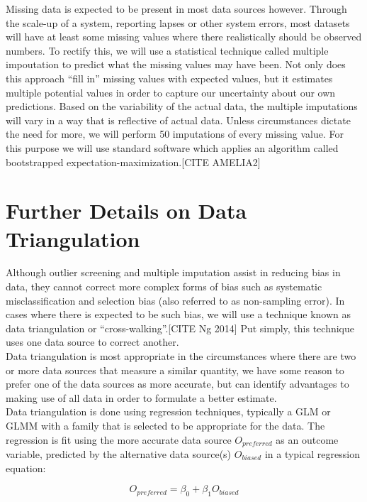 \documentclass[twocolumn]{bmcart}%
\begin{document}
Missing data is expected to be present in most data sources however. Through the scale-up of a system, reporting lapses or other system errors, most datasets will have at least some missing values where there realistically should be observed numbers. To rectify this, we will use a statistical technique called multiple impoutation to predict what the missing values may have been. Not only does this approach ``fill in'' missing values with expected values, but it estimates multiple potential values in order to capture our uncertainty about our own predictions. Based on the variability of the actual data, the multiple imputations will vary in a way that is reflective of actual data. Unless circumstances dictate the need for more, we will perform 50 imputations of every missing value. For this purpose we will use standard software which applies an algorithm called bootstrapped expectation-maximization.[CITE AMELIA2]

\section{Further Details on Data Triangulation} \label{triangulation}
Although outlier screening and multiple imputation assist in reducing bias in data, they cannot correct more complex forms of bias such as systematic misclassification and selection bias (also referred to as non-sampling error). In cases where there is expected to be such bias, we will use a technique known as data triangulation or ``cross-walking''.[CITE Ng 2014] Put simply, this technique uses one data source to correct another. \\

Data triangulation is most appropriate in the circumstances where there are two or more data sources that measure a similar quantity, we have some reason to prefer one of the data sources as more accurate, but can identify advantages to making use of all data in order to formulate a better estimate. \\

Data triangulation is done using regression techniques, typically a GLM or GLMM with a family that is selected to be appropriate for the data. The regression is fit using the more accurate data source $O_{preferred}$ as an outcome variable, predicted by the alternative data source(s) $O_{biased}$ in a typical regression equation:

\begin{equation}
  O_{preferred}=\beta_0 + \beta_1 O_{biased}
\end{equation}
\end{document}
